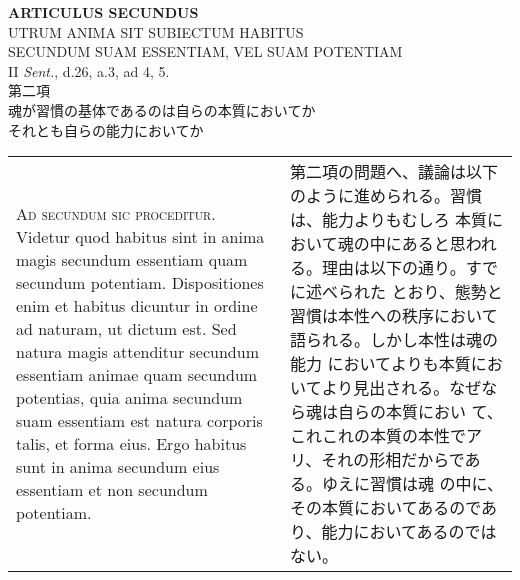 \documentclass[10pt]{jsarticle} %
\begin{document}
\newpage



\begin{center}
{\Large {\bf ARTICULUS SECUNDUS}}\\
{\large UTRUM ANIMA SIT SUBIECTUM HABITUS\\SECUNDUM SUAM ESSENTIAM, VEL SUAM POTENTIAM}\\
{\footnotesize II {\itshape Sent.}, d.26, a.3, ad 4, 5.}\\
{\Large 第二項\\魂が習慣の基体であるのは自らの本質においてか\\それとも自らの能力においてか}
\end{center}

\begin{longtable}{p{21em}p{21em}}


{\scshape Ad secundum sic proceditur}. Videtur quod habitus sint in
anima magis secundum essentiam quam secundum potentiam. Dispositiones
enim et habitus dicuntur in ordine ad naturam, ut dictum est. Sed
natura magis attenditur secundum essentiam animae quam secundum
potentias, quia anima secundum suam essentiam est natura corporis
talis, et forma eius. Ergo habitus sunt in anima secundum eius
essentiam et non secundum potentiam.


&

第二項の問題へ、議論は以下のように進められる。習慣は、能力よりもむしろ
本質において魂の中にあると思われる。理由は以下の通り。すでに述べられた
とおり、態勢と習慣は本性への秩序において語られる。しかし本性は魂の能力
においてよりも本質においてより見出される。なぜなら魂は自らの本質におい
て、これこれの本質の本性でアリ、それの形相だからである。ゆえに習慣は魂
の中に、その本質においてあるのであり、能力においてあるのではない。

\\




\end{longtable}
\end{document}
